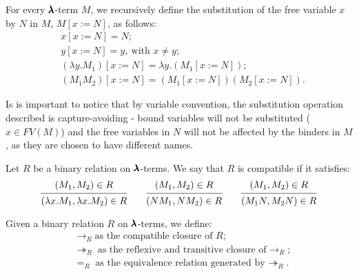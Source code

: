 \begin{definition}[Substitution]
  For every $\pmb{\lambda}$-term $M$, we recursively define the substitution of the free variable $x$ by $N$ in $M$, $M[x := N]$, as follows:
  \begin{align*}
    & x[x := N] = N; \\
    & y[x := N] = y, \ \text{with $x \neq y$}; \\
    & (\lambda y . M_1)[x := N] = \lambda y . (M_1[x := N]); \\
    & (M_1 M_2)[x := N] = (M_1[x := N]) (M_2[x := N]).
  \end{align*}
\end{definition}


\begin{remark}
  Is is important to notice that by variable convention, the substitution operation described is capture-avoiding
  - bound variables will not be substituted ($x \in FV(M)$) and the free variables in $N$ will not be affected by the binders in $M$, as they are chosen to have different names. 
\end{remark}


\begin{definition}
  Let $R$ be a binary relation on $\pmb{\lambda}$-terms.
  We say that $R$ is compatible if it satisfies:
  \[
    \begin{prooftree}
      \hypo{ (M_1, M_2) \in R }
      \infer1{ (\lambda x . M_1, \lambda x . M_2) \in R } 
    \end{prooftree}
    \qquad
    \begin{prooftree}
      \hypo{ (M_1, M_2) \in R }
      \infer1{ (N M_1, N M_2) \in R } 
    \end{prooftree}
    \qquad
    \begin{prooftree}
      \hypo{ (M_1, M_2) \in R }
      \infer1{ (M_1 N, M_2 N) \in R }
    \end{prooftree}
  \]
\end{definition}


\begin{notation}
  Given a binary relation $R$ on $\pmb{\lambda}$-terms, we define:
  \begin{align*}
    & \to_R \text{as the compatible closure of $R$} ; \\
    & \twoheadrightarrow_R \text{as the reflexive and transitive closure of $\to_R$} ; \\
    & =_R \text{as the equivalence relation generated by $\twoheadrightarrow_R$}.
  \end{align*}
\end{notation}


